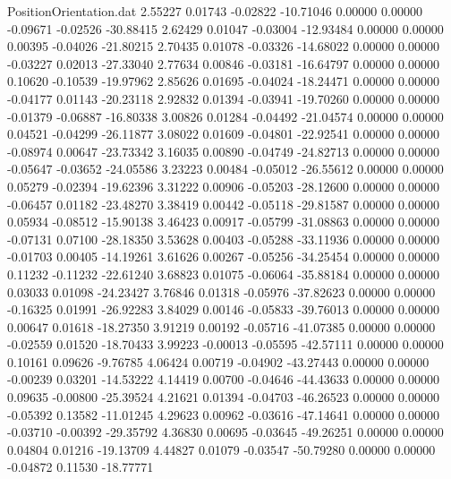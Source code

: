 \begin{filecontents}{PositionOrientation.dat}
   2.55227    0.01743   -0.02822   -10.71046    0.00000    0.00000   -0.09671   -0.02526  -30.88415
   2.62429    0.01047   -0.03004   -12.93484    0.00000    0.00000    0.00395   -0.04026  -21.80215
   2.70435    0.01078   -0.03326   -14.68022    0.00000    0.00000   -0.03227    0.02013  -27.33040
   2.77634    0.00846   -0.03181   -16.64797    0.00000    0.00000    0.10620   -0.10539  -19.97962
   2.85626    0.01695   -0.04024   -18.24471    0.00000    0.00000   -0.04177    0.01143  -20.23118
   2.92832    0.01394   -0.03941   -19.70260    0.00000    0.00000   -0.01379   -0.06887  -16.80338
   3.00826    0.01284   -0.04492   -21.04574    0.00000    0.00000    0.04521   -0.04299  -26.11877
   3.08022    0.01609   -0.04801   -22.92541    0.00000    0.00000   -0.08974    0.00647  -23.73342
   3.16035    0.00890   -0.04749   -24.82713    0.00000    0.00000   -0.05647   -0.03652  -24.05586
   3.23223    0.00484   -0.05012   -26.55612    0.00000    0.00000    0.05279   -0.02394  -19.62396
   3.31222    0.00906   -0.05203   -28.12600    0.00000    0.00000   -0.06457    0.01182  -23.48270
   3.38419    0.00442   -0.05118   -29.81587    0.00000    0.00000    0.05934   -0.08512  -15.90138
   3.46423    0.00917   -0.05799   -31.08863    0.00000    0.00000   -0.07131    0.07100  -28.18350
   3.53628    0.00403   -0.05288   -33.11936    0.00000    0.00000   -0.01703    0.00405  -14.19261
   3.61626    0.00267   -0.05256   -34.25454    0.00000    0.00000    0.11232   -0.11232  -22.61240
   3.68823    0.01075   -0.06064   -35.88184    0.00000    0.00000    0.03033    0.01098  -24.23427
   3.76846    0.01318   -0.05976   -37.82623    0.00000    0.00000   -0.16325    0.01991  -26.92283
   3.84029    0.00146   -0.05833   -39.76013    0.00000    0.00000    0.00647    0.01618  -18.27350
   3.91219    0.00192   -0.05716   -41.07385    0.00000    0.00000   -0.02559    0.01520  -18.70433
   3.99223   -0.00013   -0.05595   -42.57111    0.00000    0.00000    0.10161    0.09626   -9.76785
   4.06424    0.00719   -0.04902   -43.27443    0.00000    0.00000   -0.00239    0.03201  -14.53222
   4.14419    0.00700   -0.04646   -44.43633    0.00000    0.00000    0.09635   -0.00800  -25.39524
   4.21621    0.01394   -0.04703   -46.26523    0.00000    0.00000   -0.05392    0.13582  -11.01245
   4.29623    0.00962   -0.03616   -47.14641    0.00000    0.00000   -0.03710   -0.00392  -29.35792
   4.36830    0.00695   -0.03645   -49.26251    0.00000    0.00000    0.04804    0.01216  -19.13709
   4.44827    0.01079   -0.03547   -50.79280    0.00000    0.00000   -0.04872    0.11530  -18.77771

\end{filecontents}
